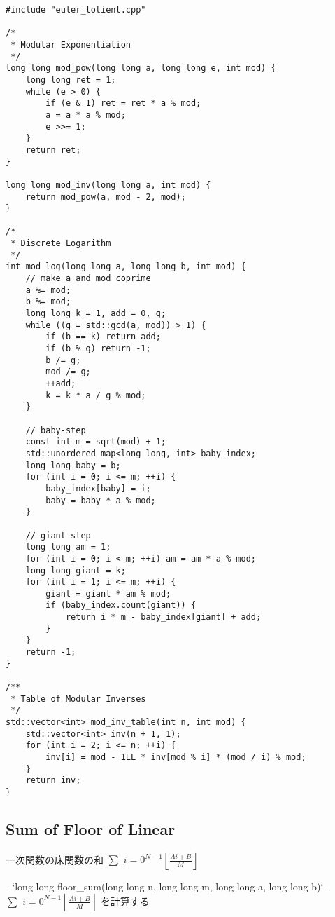\begin{lstlisting}
#include "euler_totient.cpp"

/*
 * Modular Exponentiation
 */
long long mod_pow(long long a, long long e, int mod) {
    long long ret = 1;
    while (e > 0) {
        if (e & 1) ret = ret * a % mod;
        a = a * a % mod;
        e >>= 1;
    }
    return ret;
}

long long mod_inv(long long a, int mod) {
    return mod_pow(a, mod - 2, mod);
}

/*
 * Discrete Logarithm
 */
int mod_log(long long a, long long b, int mod) {
    // make a and mod coprime
    a %= mod;
    b %= mod;
    long long k = 1, add = 0, g;
    while ((g = std::gcd(a, mod)) > 1) {
        if (b == k) return add;
        if (b % g) return -1;
        b /= g;
        mod /= g;
        ++add;
        k = k * a / g % mod;
    }

    // baby-step
    const int m = sqrt(mod) + 1;
    std::unordered_map<long long, int> baby_index;
    long long baby = b;
    for (int i = 0; i <= m; ++i) {
        baby_index[baby] = i;
        baby = baby * a % mod;
    }

    // giant-step
    long long am = 1;
    for (int i = 0; i < m; ++i) am = am * a % mod;
    long long giant = k;
    for (int i = 1; i <= m; ++i) {
        giant = giant * am % mod;
        if (baby_index.count(giant)) {
            return i * m - baby_index[giant] + add;
        }
    }
    return -1;
}

/**
 * Table of Modular Inverses
 */
std::vector<int> mod_inv_table(int n, int mod) {
    std::vector<int> inv(n + 1, 1);
    for (int i = 2; i <= n; ++i) {
        inv[i] = mod - 1LL * inv[mod % i] * (mod / i) % mod;
    }
    return inv;
}
\end{lstlisting}

\subsection{Sum of Floor of Linear}

\begin{small}
\begin{markdown}
一次関数の床関数の和 $\sum\_{i=0}^{N-1} \left\lfloor \frac{Ai + B}{M} \right\rfloor$

- `long long floor\_sum(long long n, long long m, long long a, long long b)`
    - $\sum\_{i=0}^{N-1} \left\lfloor \frac{Ai + B}{M} \right\rfloor$ を計算する
\end{markdown}
\end{small}

